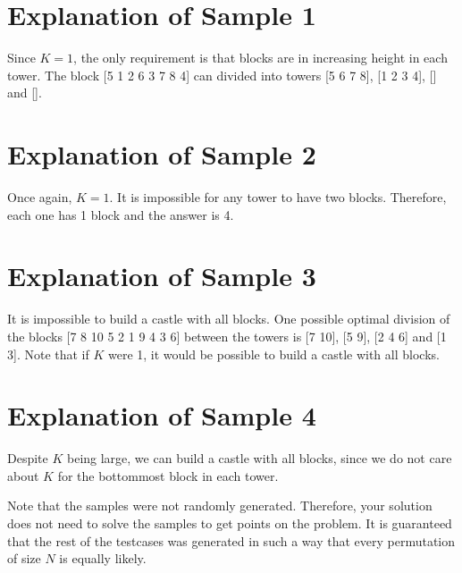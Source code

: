 \section*{Explanation of Sample 1}
Since $K=1$, the only requirement is that blocks are in increasing height in each tower.
The block [5 1 2 6 3 7 8 4] can divided into towers [5 6 7 8], [1 2 3 4], [] and [].

\section*{Explanation of Sample 2}
Once again, $K=1$. It is impossible for any tower to have two blocks. Therefore, each one has 1 block and the answer is
4.

\section*{Explanation of Sample 3}
It is impossible to build a castle with all blocks. One possible optimal division of the blocks [7 8 10 5 2 1 9 4 3 6]
between the towers is [7 10], [5 9], [2 4 6] and [1 3]. Note that if $K$ were 1, it would be possible to build a castle
with all blocks.

\section*{Explanation of Sample 4}
Despite $K$ being large, we can build a castle with all blocks, since we do not care about $K$ for the bottommost block
in each tower.

Note that the samples were not randomly generated. Therefore, your solution does not need to solve the samples to get points
on the problem. It is guaranteed that the rest of the testcases was generated in such a way that every permutation of size
$N$ is equally likely.
